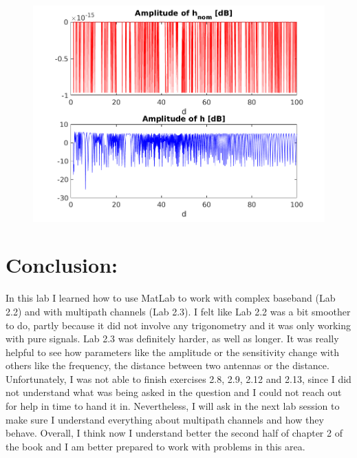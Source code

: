 \documentclass[a4paper,11pt]{article}
\begin{document}
\begin{figure}[!ht]
	\centering
	\includegraphics[scale = 0.8]{images/2_15b.png}
\end{figure}

\section{Conclusion:}

In this lab I learned how to use MatLab to work with complex baseband (Lab 2.2)
and with multipath channels (Lab 2.3). I felt like Lab 2.2 was a bit smoother to
do, partly because it did not involve any trigonometry and it was only working with
pure signals. Lab 2.3 was definitely harder, as well as longer. It was really
helpful to see how parameters like the amplitude or the sensitivity change with
others like the frequency, the distance between two antennas or the distance.
Unfortunately, I was not able to finish exercises 2.8, 2.9, 2.12 and 2.13, since I
did not understand what was being asked in the question and I could not reach
out for help in time to hand it in. Nevertheless, I will ask in the next lab
session to make sure I understand everything about multipath channels and how
they behave. Overall, I think now I understand better the second half of chapter
2 of the book and I am better prepared to work with problems in this area.

\vspace{4cm}
\end{document}
